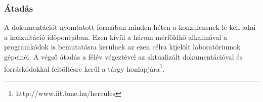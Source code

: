     \subsubsection{Átadás}
	A dokumentációt nyomtatott formában minden héten a konzulensnek le kell adni a konzultáció időpontjában. Ezen kívül a három mérföldkő alkalmával a programkódok is bemutatásra kerülnek az ezen célra kijelölt laboratóriumok gépeinél. A végső átadás a félév végeztével az aktualizált dokumentációval és forráskódokkal feltöltésre kerül a tárgy honlapjára\footnote{http://www.iit.bme.hu/hercules}.
%
%

